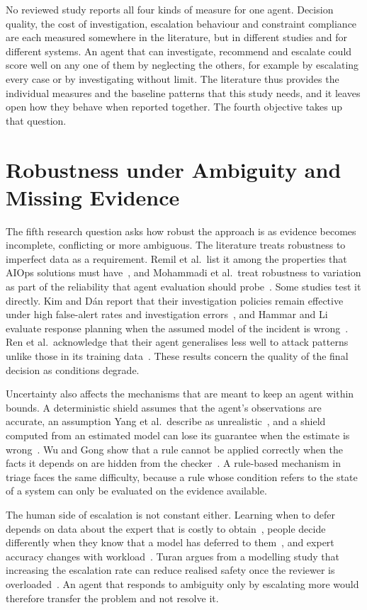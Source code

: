 \documentclass[12pt,a4paper]{article}
\begin{document}
No reviewed study reports all four kinds of measure for one agent. Decision quality, the cost of investigation, escalation behaviour and constraint compliance are each measured somewhere in the literature, but in different studies and for different systems. An agent that can investigate, recommend and escalate could score well on any one of them by neglecting the others, for example by escalating every case or by investigating without limit. The literature thus provides the individual measures and the baseline patterns that this study needs, and it leaves open how they behave when reported together. The fourth objective takes up that question.

\section{Robustness under Ambiguity and Missing Evidence}

The fifth research question asks how robust the approach is as evidence becomes incomplete, conflicting or more ambiguous. The literature treats robustness to imperfect data as a requirement. Remil et al.\ list it among the properties that AIOps solutions must have~\cite{remil2024}, and Mohammadi et al.\ treat robustness to variation as part of the reliability that agent evaluation should probe~\cite{mohammadi2025}. Some studies test it directly. Kim and D\'{a}n report that their investigation policies remain effective under high false-alert rates and investigation errors~\cite{kim2025}, and Hammar and Li evaluate response planning when the assumed model of the incident is wrong~\cite{hammar2025}. Ren et al.\ acknowledge that their agent generalises less well to attack patterns unlike those in its training data~\cite{ren2025}. These results concern the quality of the final decision as conditions degrade.

Uncertainty also affects the mechanisms that are meant to keep an agent within bounds. A deterministic shield assumes that the agent's observations are accurate, an assumption Yang et al.\ describe as unrealistic~\cite{yang2023}, and a shield computed from an estimated model can lose its guarantee when the estimate is wrong~\cite{hamel2026}. Wu and Gong show that a rule cannot be applied correctly when the facts it depends on are hidden from the checker~\cite{wu2026}. A rule-based mechanism in triage faces the same difficulty, because a rule whose condition refers to the state of a system can only be evaluated on the evidence available.

The human side of escalation is not constant either. Learning when to defer depends on data about the expert that is costly to obtain~\cite{hemmer2023}, people decide differently when they know that a model has deferred to them~\cite{bondi2022}, and expert accuracy changes with workload~\cite{zhang2026falcon}. Turan argues from a modelling study that increasing the escalation rate can reduce realised safety once the reviewer is overloaded~\cite{turan2026}. An agent that responds to ambiguity only by escalating more would therefore transfer the problem and not resolve it.
\end{document}
